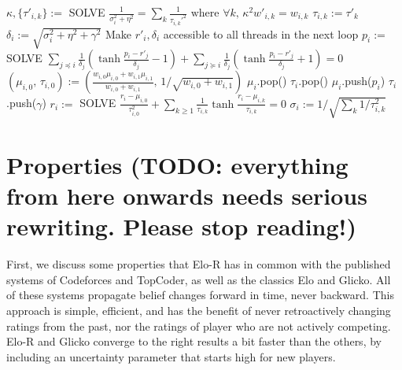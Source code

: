 \documentclass{article}
\begin{document}
\begin{algorithm}
\caption{$update()$}
\label{alg:update}
\begin{algorithmic}
\STATE $\kappa,\{\tau'_{i,k}\} := $ SOLVE $\frac{1}{\sigma_i^2 + \eta^2} = \sum_k\frac{1}{\tau_{i,k}'^2}\text{ where }\forall k,\,\kappa^2w'_{i,k} = w_{i,k}$
\STATE $\tau_{i,k} := \tau'_k$
\ENDFOR
\STATE $\delta_i := \sqrt{\sigma_i^2 + \eta^2 + \gamma^2}$
\STATE Make $r'_i,\delta_i$ accessible to all threads in the next loop
\ENDFOR
{}
\STATE $p_i := $ SOLVE $\sum_{j\preceq i}\frac{1}{\delta_j}\left( \tanh\frac {p_i - r'_j} {\delta_j} - 1 \right) + \sum_{j\succeq i}\frac{1}{\delta_j}\left( \tanh\frac {p_i - r'_j} {\delta_j} + 1 \right) = 0$
\STATE $(\mu_{i,0},\,\tau_{i,0}) := (\frac{w_{i,0}\mu_{i,0}+w_{i,1}\mu_{i,1}}{w_{i,0}+w_{i,1}},\,1 / \sqrt{w_{i,0}+w_{i,1}})$
\STATE $\mu_i$.pop()
\STATE $\tau_i$.pop()
\ENDIF
\STATE $\mu_i$.push($p_i$)
\STATE $\tau_i$.push($\gamma$)
\STATE $r_i := $ SOLVE $\frac{r_i-\mu_{i,0}}{\tau_{i,0}^2} + \sum_{k\ge 1} \frac{1}{\tau_{i,k}} \tanh \frac {r_i-\mu_{i,k}} {\tau_{i,k}} = 0$
\STATE $\sigma_i := 1 / \sqrt{\sum_k 1/\tau_{i,k}^2}$
\ENDFOR
\end{algorithmic}
\end{algorithm}

\pagebreak

\section{Properties (TODO: everything from here onwards needs serious rewriting. Please stop reading!)}

First, we discuss some properties that Elo-R has in common with the published systems of Codeforces and TopCoder, as well as the classics Elo and Glicko. All of these systems propagate belief changes forward in time, never backward. This approach is simple, efficient, and has the benefit of never retroactively changing ratings from the past, nor the ratings of player who are not actively competing. Elo-R and Glicko converge to the right results a bit faster than the others, by including an uncertainty parameter that starts high for new players.
\end{document}
